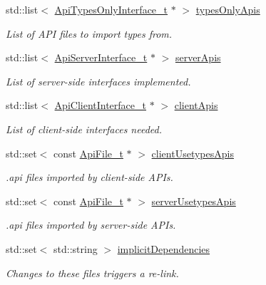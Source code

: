 \begin{DoxyCompactItemize}
std\+::list$<$ \hyperlink{structmodel_1_1_api_types_only_interface__t}{Api\+Types\+Only\+Interface\+\_\+t} $\ast$ $>$ \hyperlink{structmodel_1_1_component__t_a13b72cb57487a6881cc8d7e20a66f6d8}{types\+Only\+Apis}
\begin{DoxyCompactList}\small\item\em List of A\+PI files to import types from. \end{DoxyCompactList}\item 
std\+::list$<$ \hyperlink{structmodel_1_1_api_server_interface__t}{Api\+Server\+Interface\+\_\+t} $\ast$ $>$ \hyperlink{structmodel_1_1_component__t_a138da4905113db318567b19e58155d29}{server\+Apis}
\begin{DoxyCompactList}\small\item\em List of server-\/side interfaces implemented. \end{DoxyCompactList}\item 
std\+::list$<$ \hyperlink{structmodel_1_1_api_client_interface__t}{Api\+Client\+Interface\+\_\+t} $\ast$ $>$ \hyperlink{structmodel_1_1_component__t_adf488c6c1cb7bc280adcde69c9f7152b}{client\+Apis}
\begin{DoxyCompactList}\small\item\em List of client-\/side interfaces needed. \end{DoxyCompactList}\item 
std\+::set$<$ const \hyperlink{structmodel_1_1_api_file__t}{Api\+File\+\_\+t} $\ast$ $>$ \hyperlink{structmodel_1_1_component__t_a2be02286dc22096e7ae94ef8c9255067}{client\+Usetypes\+Apis}
\begin{DoxyCompactList}\small\item\em .api files imported by client-\/side A\+P\+Is. \end{DoxyCompactList}\item 
std\+::set$<$ const \hyperlink{structmodel_1_1_api_file__t}{Api\+File\+\_\+t} $\ast$ $>$ \hyperlink{structmodel_1_1_component__t_aa6c2555692400fe52460b0f696567fb9}{server\+Usetypes\+Apis}
\begin{DoxyCompactList}\small\item\em .api files imported by server-\/side A\+P\+Is. \end{DoxyCompactList}\item 
std\+::set$<$ std\+::string $>$ \hyperlink{structmodel_1_1_component__t_a34151bb82f0cfe3d31aae002e65c690f}{implicit\+Dependencies}
\begin{DoxyCompactList}\small\item\em Changes to these files triggers a re-\/link. \end{DoxyCompactList}\end{DoxyCompactItemize}
